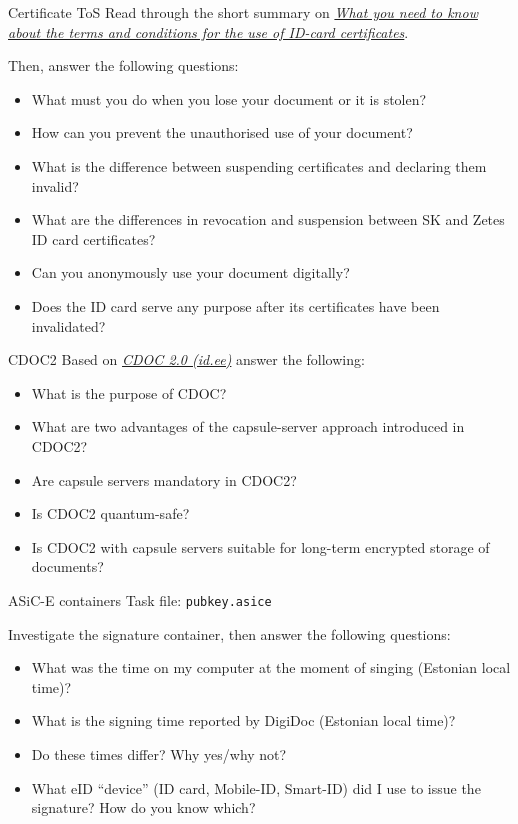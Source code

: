 \documentclass{homework}
\begin{document}
\begin{task}{Certificate ToS}
  Read through the short summary on \href{https://www.id.ee/en/article/compete-information-about-the-terms-of-use-of-certificates/\#what-you-need_2}{\textit{What you need to know about the terms and conditions for the use of ID-card certificates}}.

  Then, answer the following questions:
  \begin{itemize}
    \item What must you do when you lose your document or it is stolen?
    \item How can you prevent the unauthorised use of your document?
    \item What is the difference between suspending certificates and declaring them invalid?
    \item What are the differences in revocation and suspension between SK and Zetes ID card certificates?
    \item Can you anonymously use your document digitally?
    \item Does the ID card serve any purpose after its certificates have been invalidated?
  \end{itemize}
\end{task}

\begin{task}{CDOC2}
  Based on \href{https://www.id.ee/en/article/cdoc-2-0/}{\textit{CDOC 2.0 (id.ee)}} answer the following:

  \begin{itemize}
    \item What is the purpose of CDOC?
    \item What are two advantages of the capsule-server approach introduced in CDOC2?
    \item Are capsule servers mandatory in CDOC2?
    \item Is CDOC2 quantum-safe?
    \item Is CDOC2 with capsule servers suitable for long-term encrypted storage of documents?
  \end{itemize}
\end{task}

\begin{task}{ASiC-E containers}
  Task file: \texttt{pubkey.asice}

  Investigate the signature container, then answer the following questions:
  \begin{itemize}
    \item What was the time on my computer at the moment of singing (Estonian local time)?
    \item What is the signing time reported by DigiDoc (Estonian local time)?
    \item Do these times differ? Why yes/why not?
    \item What eID \enquote{device} (ID card, Mobile-ID, Smart-ID) did I use to issue the signature?
    How do you know which?
  \end{itemize}
\end{task}
\end{document}
